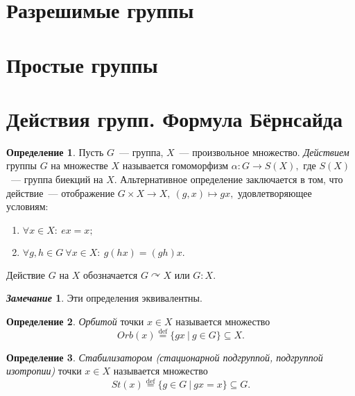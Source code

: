 \documentclass[a4paper, 14pt]{extarticle}
\newcommand{\deq}{\stackrel{\mathrm{def}}{=}}
\theoremstyle{definition}
\newtheorem*{remark}{\textit{Замечание}}
\newtheorem{definition}{Определение}
\theoremstyle{plain}
\numberwithin{theorem}{section}
\numberwithin{definition}{section}
\numberwithin{statement}{section}
\numberwithin{lemma}{section}
\numberwithin{consequence}{section}
\begin{document}
        \section{Разрешимые группы}
        \setcounter{definition}{0}

        \newpage
        \section{Простые группы}
        \setcounter{definition}{0}

        \newpage
        \section{Действия групп. Формула Бёрнсайда}
        \setcounter{definition}{0}
        \begin{definition}
            Пусть $G$~--- группа, $X$~--- произвольное множество. \textit{Действием} группы $G$ на множестве $X$ называется гомоморфизм ${\alpha : G \rightarrow S(X),}$ где $S(X)$~--- группа биекций на $X$. Альтернативное определение заключается в том, что действие~--- отображение ${G \times X \rightarrow X, \ (g,x) \mapsto gx,}$ удовлетворяющее условиям:
            \begin{enumerate}
                \setlength\itemsep{0.1em}
                \item $\forall x \in X{:} \  ex = x;$
                \item $\forall g,h \in G \ \forall x \in X{:} \ g(hx) = (gh)x.$
            \end{enumerate}
            Действие $G$ на $X$ обозначается $G \curvearrowright X$ или $G : X$.
        \end{definition}
        \begin{remark}
            Эти определения эквивалентны.
        \end{remark}
        \begin{definition}
            \textit{Орбитой} точки ${x \in X}$ называется множество
            \begin{equation*}
                Orb(x) \deq \{gx \ | \ g \in G\} \subseteq X.
            \end{equation*}
        \end{definition}
        \begin{definition}
            \textit{Стабилизатором (стационарной подгруппой, подгруппой изотропии)} точки ${x \in X}$ называется множество
            \begin{equation*}
                St(x) \deq \{g \in G \ | \ gx = x\} \subseteq G.
            \end{equation*}
        \end{definition}
\end{document}
